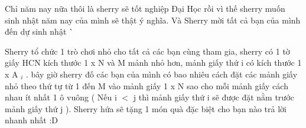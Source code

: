 Chỉ năm nay nữa thôi là sherry sẽ tốt nghiệp Đại Học rồi vì thế sherry muốn sinh nhật năm nay của mình sẽ thật ý nghĩa. Và Sherry mời tất cả bạn của mình đến dự sinh nhật ^^  

   Sherry tổ chức 1 trò chơi nhỏ cho tất cả các bạn cùng tham gia, sherry có 1 tờ giấy HCN kích thước 1 x N và M mảnh nhỏ hơn, mảnh giấy thứ i có kích thước 1 x A   $_    i   $   . bây giờ sherry đố các bạn của mình có bao nhiêu cách đặt các mảnh giấy nhỏ theo thứ tự từ 1 đến M  vào mảnh giấy 1 x N sao cho mỗi mảnh giấy cách nhau ít nhất 1 ô vuông ( Nếu i $<$ j thì mảnh giấy thứ i sẽ được đặt nằm trước mảnh giấy thứ j ). Sherry hứa sẽ tặng 1 món quà đặc biệt cho bạn nào trả lời nhanh nhất :D  

\